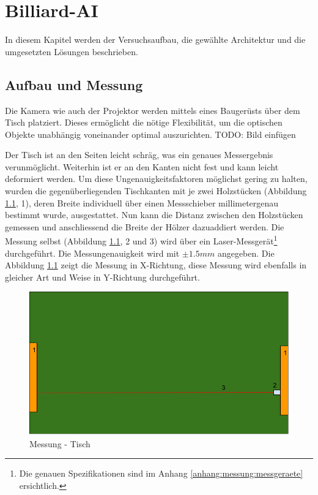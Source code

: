 \chapter{Billiard-AI}
In diesem Kapitel werden der Versuchsaufbau, die gewählte Architektur und die umgesetzten Lösungen beschrieben.




\section{Aufbau und Messung}\label{kap:aufbauMessung}
Die Kamera wie auch der Projektor werden mittels eines Baugerüsts über dem Tisch platziert. Dieses ermöglicht die nötige
Flexibilität, um die optischen Objekte unabhängig voneinander optimal auszurichten.
TODO: Bild einfügen

Der Tisch ist an den Seiten leicht schräg, was ein genaues Messergebnis verunmöglicht. Weiterhin ist er an den Kanten
nicht fest und kann leicht deformiert werden. Um diese Ungenauigkeitsfaktoren möglichst gering zu halten, wurden die
gegenüberliegenden Tischkanten mit je zwei Holzstücken (Abbildung \ref{fig:messung:tisch}, 1), deren Breite individuell
über einen Messschieber millimetergenau bestimmt wurde, ausgestattet. Nun kann die Distanz zwischen den Holzstücken
gemessen und anschliessend die Breite der Hölzer dazuaddiert werden. Die Messung selbst (Abbildung \ref{fig:messung:tisch}, 2 und 3)
wird über ein Laser-Messgerät\footnote{Die genauen Spezifikationen sind im Anhang \ref{anhang:messung:messgeraete} ersichtlich.}
durchgeführt. Die Messungenauigkeit wird mit $\pm 1.5mm$ angegeben. Die Abbildung \ref{fig:messung:tisch} zeigt die Messung in X-Richtung,
diese Messung wird ebenfalls in gleicher Art und Weise in Y-Richtung durchgeführt.
\begin{figure}[h!]
    \begin{center}
        \includegraphics[width=0.8\linewidth]{../common/03_billiard_ai/resources/01_messung_tisch.png}
    \end{center}
    \caption{Messung - Tisch}
    \label{fig:messung:tisch}
\end{figure}


